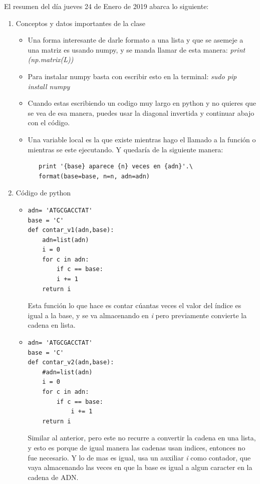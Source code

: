 \documentclass[letterpaper, 12pt,oneside]{article}
\begin{document}
	El resumen del día jueves 24 de Enero de 2019 abarca lo siguiente:
	\begin{enumerate}
		\item Conceptos y datos importantes de la clase
			\begin{itemize}
				\item Una forma interesante de darle formato a una lista y que se asemeje a una matriz es usando numpy, y se manda llamar de esta manera: \textit{print (np.matrix(L))}\\
				

				\item Para instalar numpy basta con escribir esto en la terminal: \textit{sudo pip install numpy}\\
				
				\item Cuando estas escribiendo un codigo muy largo en python y no quieres que se vea de esa manera, puedes usar la diagonal invertida y continuar abajo con el código.\\
				
				\item Una variable local es la que existe mientras hago el llamado a la función o mientras se este ejecutando. Y quedaría de la siguiente manera:  \begin{lstlisting}
   print '{base} aparece {n} veces en {adn}'.\
   format(base=base, n=n, adn=adn)
				\end{lstlisting}
				
				
				
			\end{itemize}
		
		
		
		\item Código de python
			\begin{itemize}
				\item \begin{lstlisting}
adn= 'ATGCGACCTAT'
base = 'C'				
def contar_v1(adn,base):
    adn=list(adn)
    i = 0
    for c in adn:
        if c == base:
        i += 1
    return i
				\end{lstlisting} Esta función lo que hace es contar cúantas veces el valor del índice es igual a la base, y se va almacenando en \textit{i} pero previamente convierte la cadena en lista.\\
				
				
				\item \begin{lstlisting}
adn= 'ATGCGACCTAT'
base = 'C'
def contar_v2(adn,base):
    #adn=list(adn)
    i = 0
    for c in adn:
        if c == base:
            i += 1
    return i
				\end{lstlisting} Similar al anterior, pero este no recurre a convertir la cadena en una lista, y esto es porque de igual manera las cadenas usan indices, entonces no fue necesario. Y lo de mas es igual, usa un auxiliar \textit{i} como contador, que vaya almacenando las veces en que la base es igual a algun caracter en la cadena de ADN.\\
				

\end{itemize}
\end{enumerate}
\end{document}
